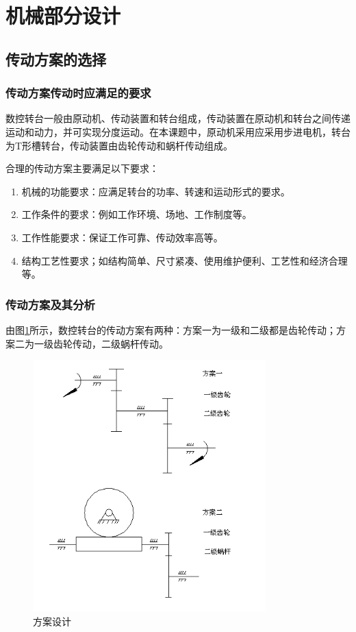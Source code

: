 \documentclass[a4paper,12pt]{article}
\begin{document}
\section{机械部分设计}

\subsection{传动方案的选择}
\subsubsection{传动方案传动时应满足的要求}
数控转台一般由原动机、传动装置和转台组成，传动装置在原动机和转台之间传递运动和动力，并可实现分度运动。在本课题中，原动机采用应采用步进电机，转台为T形槽转台，传动装置由齿轮传动和蜗杆传动组成。

合理的传动方案主要满足以下要求：
\begin{enumerate}
	\item 机械的功能要求：应满足转台的功率、转速和运动形式的要求。
	\item 工作条件的要求：例如工作环境、场地、工作制度等。
	\item 工作性能要求：保证工作可靠、传动效率高等。
	\item 结构工艺性要求；如结构简单、尺寸紧凑、使用维护便利、工艺性和经济合理等。
\end{enumerate}
\subsubsection{传动方案及其分析}
由图\ref{方案设计}所示，数控转台的传动方案有两种：方案一为一级和二级都是齿轮传动；方案二为一级齿轮传动，二级蜗杆传动。

	\begin{figure}[htb]
		\begin{center}
			\includegraphics[width=9cm]{images/1}
		\caption{方案设计}  \label{方案设计}
	\end{center}
	\end{figure}
\end{document}
